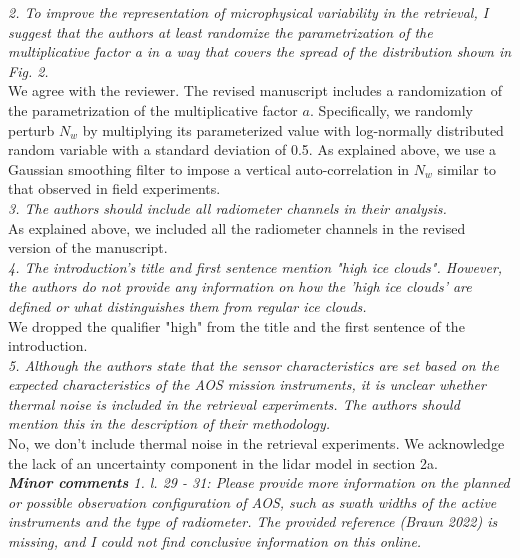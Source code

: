 \documentclass[12pt]{article}
\begin{document}
\noindent
\textit{2. To improve the representation of microphysical variability in the retrieval, I suggest that the authors at 
    least randomize the parametrization of the multiplicative factor a in a way that covers the spread of the distribution 
    shown in Fig. 2.}\\
\newline
We agree with the reviewer. The revised manuscript includes a randomization of the parametrization of the multiplicative factor $a$.  Specifically,
we randomly perturb $N_w$ by multiplying its parameterized value with log-normally distributed
random variable with a standard deviation of 0.5.  As explained above, we use a Gaussian smoothing filter to impose a vertical auto-correlation in
$N_w$ similar to that observed in field experiments.\\
\newline
\textit{3. The authors should include all radiometer channels in their analysis.}\\
\newline
As explained above, we included all the radiometer channels in the revised version of the manuscript.\\
\newline
\textit{4. The introduction's title and first sentence mention "high ice clouds". However, the authors do not provide any 
    information on how the 'high ice clouds' are defined or what distinguishes them from regular ice clouds.}\\
\newline
We dropped the qualifier "high" from the title and the first sentence of the introduction.\\
\newline
\textit{5. Although the authors state that the sensor characteristics are set based on the expected characteristics of the 
    AOS mission instruments, it is unclear whether thermal noise is included in the retrieval experiments. 
    The authors should mention this in the description of their methodology.}\\
\newline
No, we don't include thermal noise in the retrieval experiments.  We acknowledge the lack of an uncertainty component in 
the lidar model in section 2a.\\ 
\newline
\textit{\textbf{Minor comments}
    1. l. 29 - 31: Please provide more information on the planned or possible observation configuration of AOS, such as swath
     widths of the active instruments and the type of radiometer. The provided reference (Braun 2022) is missing, and I 
     could not find conclusive information on this online.}\\
\end{document}
